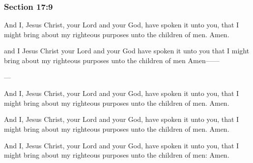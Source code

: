 	\subsubsection{Section 17:9} %
		\label{DC17-9}

		And I, Jesus Christ, your Lord and your God, have spoken it unto you, that I might bring about my righteous purposes unto the children of men.  Amen.

		\begin{framed}
		\scriptsize
			\begin{compactdesc}
				\item[JSP] and I Jesus Christ your Lord and your God have spoken it unto you that I might bring about my righteous purposes unto the children of men Amen------
				\item[BC] --- 
				\item[MA] And I, Jesus Christ, your Lord and your God, have spoken it unto you, that I might bring about my righteous purposes unto the children of men. Amen.
				\item[DC 1835] And I, Jesus Christ, your Lord and your God, have spoken it unto you, that I might bring about my righteous purposes unto the children of men. Amen.
				\item[DC 1844] And I, Jesus Christ, your Lord and your God, have spoken it unto you, that I might bring about my righteous purposes unto the children of men: Amen.
			\end{compactdesc}
		\end{framed}